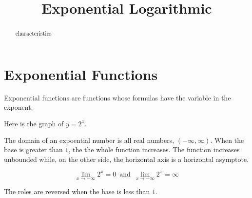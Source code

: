 \documentclass{ximera}
\title{Exponential Logarithmic}
\begin{document}
\begin{abstract}
characteristics
\end{abstract}
\maketitle


\section{Exponential Functions}

Exponential functions are functions whose formulas have the variable in the exponent.






Here is the graph of $y = 2^x$.

\begin{image}
\end{image}


The domain of an expoential number is all real numbers, $(-\infty, \infty)$.  When the base is greater than $1$, the the whole function increases.  The function increases unbounded while, on the other side, the horizontal axis is a horizontal asymptote.

\[  \lim_{x \to -\infty} 2^x = 0     \, \text{ and } \,  \lim_{x \to -\infty} 2^x = \infty   \]



The roles are reversed when the base is less than $1$.
\end{document}
